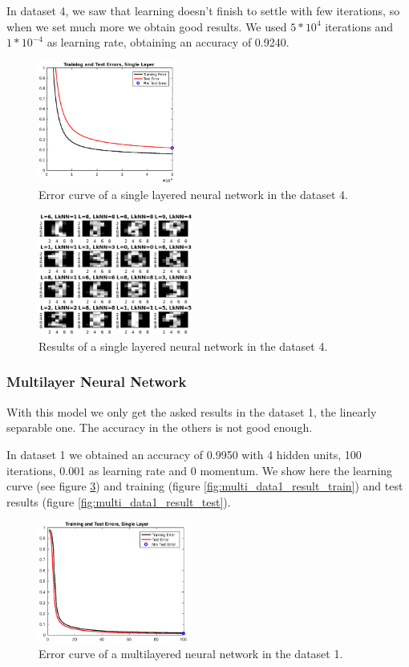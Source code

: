 \documentclass{article}
\begin{document}
In dataset 4, we saw that learning doesn't finish to settle with few iterations, so when we set much more we obtain good results. We used $5*10^4$ iterations and $1*10^{-4}$ as learning rate, obtaining an accuracy of 0.9240.

\begin{figure}[!htb]
\centering
\includegraphics[height=4cm]{images/single_data4_error}
\caption{Error curve of a single layered neural network in the dataset 4.}
\label{fig:single_data4_error}
\end{figure}

\begin{figure}[!htb]
\centering
\includegraphics[height=4cm]{images/single_data4_result}
\caption{Results of a single layered neural network in the dataset 4.}
\label{fig:single_data4_result}
\end{figure}


\subsubsection{Multilayer Neural Network}

With this model we only get the asked results in the dataset 1, the linearly separable one. The accuracy in the others is not good enough.

In dataset 1 we obtained an accuracy of 0.9950 with 4 hidden units, 100 iterations, 0.001 as learning rate and 0 momentum. We show here the learning curve (see figure \ref{fig:multi_data1_error}) and training (figure \ref{fig:multi_data1_result_train}) and test results (figure \ref{fig:multi_data1_result_test}).

\begin{figure}[!htb]
\centering
\includegraphics[height=4cm]{images/multi_data1_error}
\caption{Error curve of a multilayered neural network in the dataset 1.}
\label{fig:multi_data1_error}
\end{figure}
\end{document}
